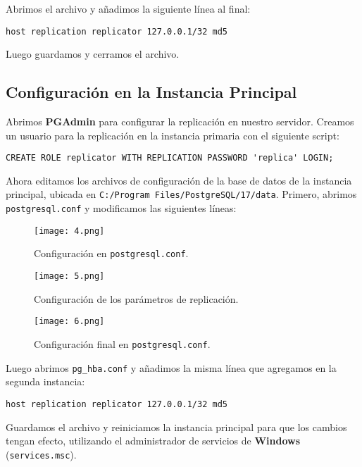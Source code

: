 \documentclass{article}
\begin{document}
Abrimos el archivo y añadimos la siguiente línea al final:

\begin{verbatim}
host replication replicator 127.0.0.1/32 md5
\end{verbatim}

Luego guardamos y cerramos el archivo.

\newpage
\subsection{Configuración en la Instancia Principal}

Abrimos \textbf{PGAdmin} para configurar la replicación en nuestro servidor. Creamos un usuario para la replicación en la instancia primaria con el siguiente script:

\begin{verbatim}
CREATE ROLE replicator WITH REPLICATION PASSWORD 'replica' LOGIN;
\end{verbatim}

Ahora editamos los archivos de configuración de la base de datos de la instancia principal, ubicada en \texttt{C:/Program Files/PostgreSQL/17/data}. Primero, abrimos \texttt{postgresql.conf} y modificamos las siguientes líneas:

\begin{figure}[h]
    \centering
    \texttt{[image: 4.png]}
    \caption{Configuración en \texttt{postgresql.conf}.}
\end{figure}

\begin{figure}[h]
    \centering
    \texttt{[image: 5.png]}
    \caption{Configuración de los parámetros de replicación.}
\end{figure}

\begin{figure}[h]
    \centering
    \texttt{[image: 6.png]}
    \caption{Configuración final en \texttt{postgresql.conf}.}
\end{figure}

Luego abrimos \texttt{pg\_hba.conf} y añadimos la misma línea que agregamos en la segunda instancia:

\begin{verbatim}
host replication replicator 127.0.0.1/32 md5
\end{verbatim}

Guardamos el archivo y reiniciamos la instancia principal para que los cambios tengan efecto, utilizando el administrador de servicios de \textbf{Windows} (\texttt{services.msc}).
\end{document}
